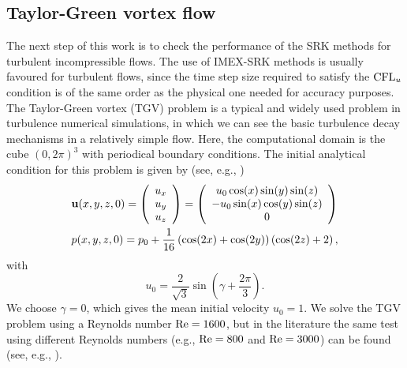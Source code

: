 \subsection{Taylor-Green vortex flow}
\label{subsec-C6_TGV}
The next step of this work is to check the performance of the SRK methods for turbulent incompressible flows. The use of IMEX-SRK methods is usually favoured for turbulent flows, since the time step size required to satisfy the  ${\rm CFL}_u$ condition is of the same order as the physical one needed for accuracy purposes. 
The Taylor-Green vortex (TGV) problem is a typical and widely used problem in turbulence numerical simulations, in which we can see the basic turbulence decay mechanisms  in a relatively simple flow. Here, the computational domain is the cube $(0,2\pi)^3$ with periodical boundary conditions. The initial analytical condition for this problem is given by (see, e.g., \cite{brachet_direct_1991})
\begin{align}
\label{eq-C6_ini_sol_TG}
&{\bf u}(x,y,z,0)=\left(\begin{array}{c}
u_x\\
u_y\\
u_z
\end{array}\right)=\left(\begin{array}{c}
u_0\cos(x)\sin(y)\sin(z)\\
-u_0\sin(x)\cos(y)\sin(z)\\
0
\end{array}\right)\\\nonumber
&p(x,y,z,0)=p_0+\frac{1}{16}\left(\cos(2x)+\cos(2y)\right)\left(\cos(2z)+2\right),
\end{align}
with
$$u_0=\frac{2}{\sqrt{3}}\sin\left(\gamma+\frac{2\pi}{3}\right).$$
We choose $\gamma=0$, which gives the mean initial velocity  $u_0=1$. We solve the TGV problem using a Reynolds number ${\rm Re}=1600$, but in the literature the same test using different Reynolds numbers (e.g., ${\rm Re}=800$ and ${\rm Re}=3000$) can be found (see, e.g., \cite{gassner_accuracy_2013,hickel_adaptive_2006}).

